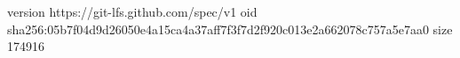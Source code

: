 version https://git-lfs.github.com/spec/v1
oid sha256:05b7f04d9d26050e4a15ca4a37aff7f3f7d2f920c013e2a662078c757a5e7aa0
size 174916
